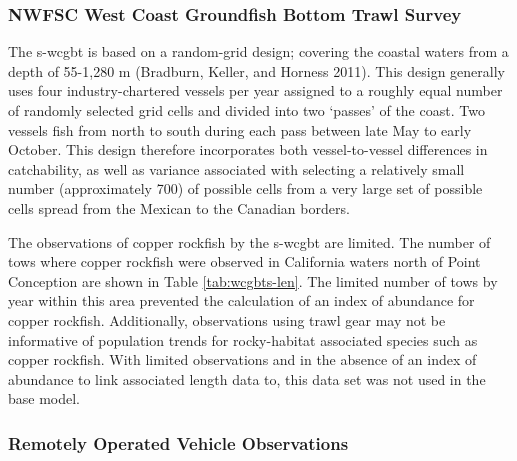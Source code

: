 \documentclass[11pt,
  english,
  a4paper,
]{article}
\begin{document}
\hypertarget{nwfsc-west-coast-groundfish-bottom-trawl-survey}{%
\subsubsection{NWFSC West Coast Groundfish Bottom Trawl Survey}\label{nwfsc-west-coast-groundfish-bottom-trawl-survey}}

\leavevmode\tagmcend\tagstructend


The \Gls{s-wcgbt} is based on a random-grid design; covering the coastal waters from a depth of 55-1,280 m {(Bradburn, Keller, and Horness 2011)\leavevmode\tagmcend\tagstructend}. This design generally uses four industry-chartered vessels per year assigned to a roughly equal number of randomly selected grid cells and divided into two `passes' of the coast. Two vessels fish from north to south during each pass between late May to early October. This design therefore incorporates both vessel-to-vessel differences in catchability, as well as variance associated with selecting a relatively small number (approximately 700) of possible cells from a very large set of possible cells spread from the Mexican to the Canadian borders.

\leavevmode\tagmcend\tagstructend\par


The observations of copper rockfish by the \Gls{s-wcgbt} are limited. The number of tows where copper rockfish were observed in California waters north of Point Conception are shown in Table \ref{tab:wcgbts-len}. The limited number of tows by year within this area prevented the calculation of an index of abundance for copper rockfish. Additionally, observations using trawl gear may not be informative of population trends for rocky-habitat associated species such as copper rockfish. With limited observations and in the absence of an index of abundance to link associated length data to, this data set was not used in the base model.

\leavevmode\tagmcend\tagstructend\par


\hypertarget{remotely-operated-vehicle-observations}{%
\subsubsection{Remotely Operated Vehicle Observations}\label{remotely-operated-vehicle-observations}}
\end{document}
